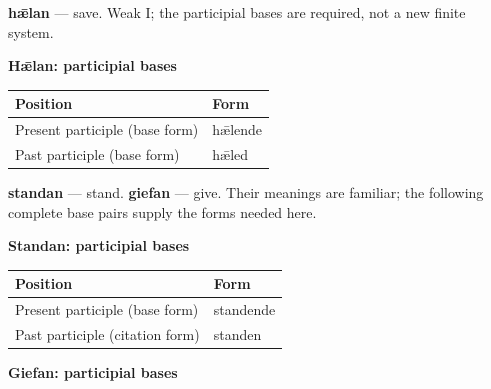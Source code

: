 \textbf{hǣlan} — save. Weak I; the participial bases are required, not a new finite system.

\textbf{Hǣlan: participial bases}

\par\begingroup
\fontsize{10.5}{13.2}\selectfont
\setlength{\LTleft}{0pt}\setlength{\LTright}{\fill}
\noindent
\begin{tabular}{@{}>{\raggedright\arraybackslash}p{79.4mm}>{\raggedright\arraybackslash}p{41.79mm}@{}}
\toprule
\textbf{Position} & \textbf{Form} \\
\midrule
Present participle (base form) & hǣlende \\
Past participle (base form) & hǣled \\
\bottomrule
\end{tabular}
\par\endgroup

\textbf{standan} — stand. \textbf{giefan} — give. Their meanings are familiar; the following complete base pairs supply the forms needed here.

\textbf{Standan: participial bases}

\par\begingroup
\fontsize{10.5}{13.2}\selectfont
\setlength{\LTleft}{0pt}\setlength{\LTright}{\fill}
\noindent
\begin{tabular}{@{}>{\raggedright\arraybackslash}p{80.04mm}>{\raggedright\arraybackslash}p{41.15mm}@{}}
\toprule
\textbf{Position} & \textbf{Form} \\
\midrule
Present participle (base form) & standende \\
Past participle (citation form) & standen \\
\bottomrule
\end{tabular}
\par\endgroup

\textbf{Giefan: participial bases}

